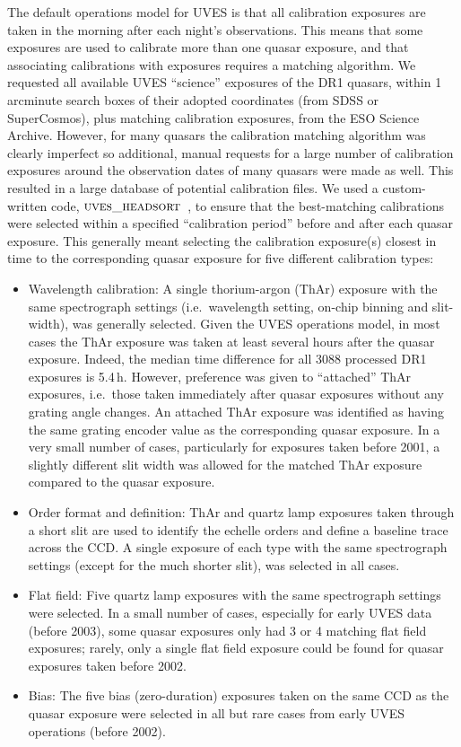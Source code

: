 \documentclass[fleqn,usenatbib,usedcolumn]{mnras}
\newcommand{\headsort}{\ensuremath{\textsc{uves\_headsort}}}
\begin{document}
The default operations model for UVES is that all calibration exposures are taken in the morning after each night's observations. This means that some exposures are used to calibrate more than one quasar exposure, and that associating calibrations with exposures requires a matching algorithm. We requested all available UVES ``science'' exposures of the DR1 quasars, within 1 arcminute search boxes of their adopted coordinates (from SDSS or SuperCosmos), plus matching calibration exposures, from the ESO Science Archive. However, for many quasars the calibration matching algorithm was clearly imperfect so additional, manual requests for a large number of calibration exposures around the observation dates of many quasars were made as well. This resulted in a large database of potential calibration files. We used a custom-written code, \headsort\ \citep{Murphy:2016:UVESheadsort}, to ensure that the best-matching calibrations were selected within a specified ``calibration period'' before and after each quasar exposure. This generally meant selecting the calibration exposure(s) closest in time to the corresponding quasar exposure for five different calibration types:
\begin{itemize}
\item Wavelength calibration: A single thorium-argon (ThAr) exposure with the same spectrograph settings (i.e.\ wavelength setting, on-chip binning and slit-width), was generally selected. Given the UVES operations model, in most cases the ThAr exposure was taken at least several hours after the quasar exposure. Indeed, the median time difference for all 3088 processed DR1 exposures is 5.4\,h. However, preference was given to ``attached'' ThAr exposures, i.e.\ those taken immediately after quasar exposures without any grating angle changes. An attached ThAr exposure was identified as having the same grating encoder value as the corresponding quasar exposure. In a very small number of cases, particularly for exposures taken before 2001, a slightly different slit width was allowed for the matched ThAr exposure compared to the quasar exposure.
\item Order format and definition: ThAr and quartz lamp exposures taken through a short slit are used to identify the echelle orders and define a baseline trace across the CCD. A single exposure of each type with the same spectrograph settings (except for the much shorter slit), was selected in all cases.
\item Flat field: Five quartz lamp exposures with the same spectrograph settings were selected. In a small number of cases, especially for early UVES data (before 2003), some quasar exposures only had 3 or 4 matching flat field exposures; rarely, only a single flat field exposure could be found for quasar exposures taken before 2002.
\item Bias: The five bias (zero-duration) exposures taken on the same CCD as the quasar exposure were selected in all but rare cases from early UVES operations (before 2002).
\end{itemize}
\end{document}
